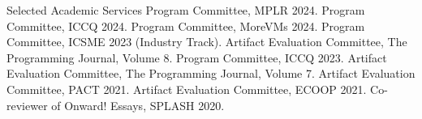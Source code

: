 \begin{rubric}{Selected Academic Services}
  \entry*[2024] Program Committee, MPLR 2024.
  \entry*[2024] Program Committee, ICCQ 2024.
  \entry*[2024] Program Committee, MoreVMs 2024.
  \entry*[2023] Program Committee, ICSME 2023 (Industry Track).
  \entry*[2023] Artifact Evaluation Committee, The Programming Journal, Volume 8.
  \entry*[2023] Program Committee, ICCQ 2023.
  \entry*[2022] Artifact Evaluation Committee, The Programming Journal, Volume 7.
  \entry*[2021] Artifact Evaluation Committee, PACT 2021.
  \entry*[2021] Artifact Evaluation Committee, ECOOP 2021.
  \entry*[2020] Co-reviewer of Onward! Essays, SPLASH 2020.
\end{rubric}
